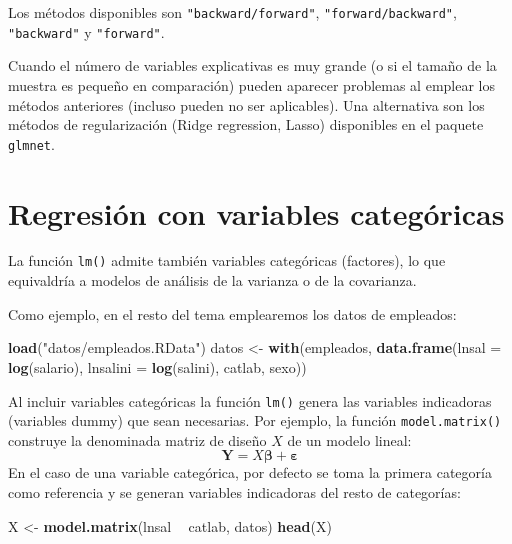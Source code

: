 \documentclass[]{book}
\newenvironment{Shaded}{\begin{snugshade}}{\end{snugshade}}
\newcommand{\DataTypeTok}[1]{\textcolor[rgb]{0.13,0.29,0.53}{#1}}
\newcommand{\KeywordTok}[1]{\textcolor[rgb]{0.13,0.29,0.53}{\textbf{#1}}}
\newcommand{\NormalTok}[1]{#1}
\newcommand{\OperatorTok}[1]{\textcolor[rgb]{0.81,0.36,0.00}{\textbf{#1}}}
\newcommand{\StringTok}[1]{\textcolor[rgb]{0.31,0.60,0.02}{#1}}
\begin{document}
Los métodos disponibles son \texttt{"backward/forward"}, \texttt{"forward/backward"}, \texttt{"backward"} y \texttt{"forward"}.

Cuando el número de variables explicativas es muy grande (o si el tamaño de la muestra es pequeño en comparación) pueden aparecer problemas al emplear los métodos anteriores (incluso pueden no ser aplicables). Una alternativa son los métodos de regularización (Ridge regression, Lasso) disponibles en el paquete \texttt{glmnet}.

\hypertarget{regresion-con-variables-categoricas}{%
\section{Regresión con variables categóricas}\label{regresion-con-variables-categoricas}}

La función \texttt{lm()} admite también variables categóricas (factores), lo que equivaldría a modelos de análisis de la varianza o de la covarianza.

Como ejemplo, en el resto del tema emplearemos los datos de empleados:

\begin{Shaded}
\begin{Highlighting}[]
\KeywordTok{load}\NormalTok{(}\StringTok{"datos/empleados.RData"}\NormalTok{)}
\NormalTok{datos <-}\StringTok{ }\KeywordTok{with}\NormalTok{(empleados, }\KeywordTok{data.frame}\NormalTok{(}\DataTypeTok{lnsal =} \KeywordTok{log}\NormalTok{(salario), }\DataTypeTok{lnsalini =} \KeywordTok{log}\NormalTok{(salini), catlab, sexo))}
\end{Highlighting}
\end{Shaded}

Al incluir variables categóricas la función \texttt{lm()} genera las variables indicadoras (variables dummy) que sean necesarias.
Por ejemplo, la función \texttt{model.matrix()} construye la denominada matriz de diseño \(X\) de un modelo lineal:
\[\mathbf{Y}=X\mathbf{\beta}+\mathbf{\varepsilon}\]
En el caso de una variable categórica, por defecto se toma la primera categoría como referencia y se generan variables indicadoras del resto de categorías:

\begin{Shaded}
\begin{Highlighting}[]
\NormalTok{X <-}\StringTok{ }\KeywordTok{model.matrix}\NormalTok{(lnsal }\OperatorTok{~}\StringTok{ }\NormalTok{catlab, datos)}
\KeywordTok{head}\NormalTok{(X)}
\end{Highlighting}
\end{Shaded}
\end{document}
